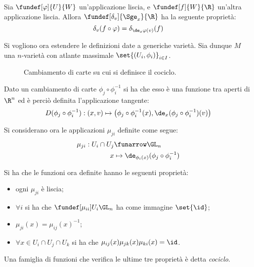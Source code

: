 \begin{oss}
Sia $\fundef[\varphi]{U}{W}$ un'applicazione liscia, e $\fundef[f]{W}{\R}$ un'altra applicazione liscia. Allora $\fundef[\delta_v]{\Sge_x}{\R}$ ha la seguente proprietà:
\begin{equation*}
\delta_v(f\circ \varphi) = \delta_{\de_x\varphi (v)}(f)
\end{equation*}
\end{oss}


Si vogliono ora estendere le definizioni date a generiche varietà.
Sia dunque $M$ una $n$-varietà con atlante massimale $\set{(U_i, \phi _i)}_{i\in I}$.

\begin{figure}
\centering

\caption{Cambiamento di carte su cui si definisce il cociclo.}
\end{figure}

\begin{oss}
Dato un cambiamento di carte $\phi _j \circ \phi _i ^{-1}$ si ha che esso è una funzione tra aperti di $\R ^n$ ed è perciò definita l'applicazione tangente:
\begin{equation*}
D(\phi _j \circ \phi _i ^{-1}): (x,v) \mapsto \big(\phi _j \circ \phi _i ^{-1}(x), \de_x(\phi _j \circ \phi _i ^{-1})(v)\big)
\end{equation*}
\end{oss}

Si considerano ora le applicazioni $\mu_{ji}$ definite come segue:
\begin{align*}
\mu_{ji} : U_i\cap U_j &\funarrow \GL_n \\
x &\mapsto \de_{\phi_i(x)}(\phi _j \circ \phi _i ^{-1})
\end{align*}

\begin{oss}
Si ha che le funzioni ora definite hanno le seguenti proprietà:
\begin{itemize}
\item ogni $\mu_{ji}$ è liscia;
\item $\forall i$ si ha che $\fundef[\mu_{ii}]{U_i}{\GL_n}$ ha come immagine $\set{\id}$;
\item $\mu_{ji}(x) = \mu_{ij}(x)^{-1}$;
\item $\forall x \in U_i\cap U_j\cap U_k$ si ha che $\mu_{ij}(x)\mu_{jk}(x)\mu_{ki}(x) = \id$.
\end{itemize}
Una famiglia di funzioni che verifica le ultime tre proprietà è detta \emph{cociclo}.
\end{oss}


\begin{epigraphs}	
\end{epigraphs}
